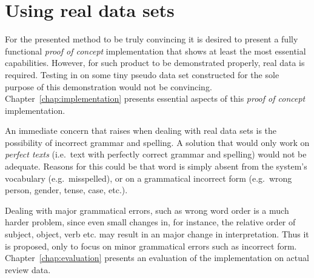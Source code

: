 \section{Using real data sets}
\label{sec:realData}

For the presented method to be truly convincing it is desired to present a fully functional \emph{proof of concept} implementation that shows at least the most essential capabilities. However, for such product to be demonstrated properly, real data is required. Testing in on some tiny pseudo data set constructed for the sole purpose of this demonstration would not be convincing. Chapter~\ref{chap:implementation} presents essential aspects of this \emph{proof of concept} implementation. 

An immediate concern that raises when dealing with real data sets is the possibility of incorrect grammar and spelling. A solution that would only work on \emph{perfect texts} (i.e.\ text with perfectly correct grammar and spelling) would not be adequate. %
Reasons for this could be that word is simply absent from the system's vocabulary (e.g.\ misspelled), or on a grammatical incorrect form (e.g.\ wrong person, gender, tense, case, etc.). 

Dealing with major grammatical errors, such as wrong word order is a much harder problem, since even small changes in, for instance, the relative order of subject, object, verb etc. may result in an major change in interpretation. Thus it is proposed, only to focus on minor grammatical errors such as incorrect form. Chapter~\ref{chap:evaluation} presents an evaluation of the implementation on actual review data.
